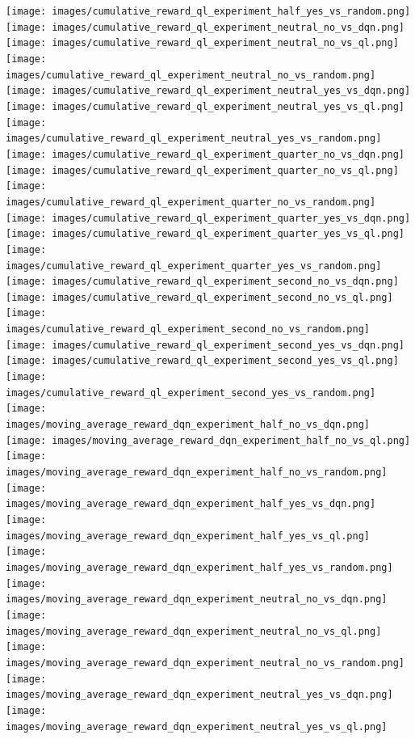 \texttt{[image: images/cumulative\_reward\_ql\_experiment\_half\_yes\_vs\_random.png]} 
\texttt{[image: images/cumulative\_reward\_ql\_experiment\_neutral\_no\_vs\_dqn.png]} 
\texttt{[image: images/cumulative\_reward\_ql\_experiment\_neutral\_no\_vs\_ql.png]} 
\texttt{[image: images/cumulative\_reward\_ql\_experiment\_neutral\_no\_vs\_random.png]} 
\texttt{[image: images/cumulative\_reward\_ql\_experiment\_neutral\_yes\_vs\_dqn.png]} 
\texttt{[image: images/cumulative\_reward\_ql\_experiment\_neutral\_yes\_vs\_ql.png]} 
\texttt{[image: images/cumulative\_reward\_ql\_experiment\_neutral\_yes\_vs\_random.png]} 
\texttt{[image: images/cumulative\_reward\_ql\_experiment\_quarter\_no\_vs\_dqn.png]} 
\texttt{[image: images/cumulative\_reward\_ql\_experiment\_quarter\_no\_vs\_ql.png]} 
\texttt{[image: images/cumulative\_reward\_ql\_experiment\_quarter\_no\_vs\_random.png]} 
\texttt{[image: images/cumulative\_reward\_ql\_experiment\_quarter\_yes\_vs\_dqn.png]} 
\texttt{[image: images/cumulative\_reward\_ql\_experiment\_quarter\_yes\_vs\_ql.png]} 
\texttt{[image: images/cumulative\_reward\_ql\_experiment\_quarter\_yes\_vs\_random.png]} 
\texttt{[image: images/cumulative\_reward\_ql\_experiment\_second\_no\_vs\_dqn.png]} 
\texttt{[image: images/cumulative\_reward\_ql\_experiment\_second\_no\_vs\_ql.png]} 
\texttt{[image: images/cumulative\_reward\_ql\_experiment\_second\_no\_vs\_random.png]} 
\texttt{[image: images/cumulative\_reward\_ql\_experiment\_second\_yes\_vs\_dqn.png]} 
\texttt{[image: images/cumulative\_reward\_ql\_experiment\_second\_yes\_vs\_ql.png]} 
\texttt{[image: images/cumulative\_reward\_ql\_experiment\_second\_yes\_vs\_random.png]} 
\texttt{[image: images/moving\_average\_reward\_dqn\_experiment\_half\_no\_vs\_dqn.png]} 
\texttt{[image: images/moving\_average\_reward\_dqn\_experiment\_half\_no\_vs\_ql.png]} 
\texttt{[image: images/moving\_average\_reward\_dqn\_experiment\_half\_no\_vs\_random.png]} 
\texttt{[image: images/moving\_average\_reward\_dqn\_experiment\_half\_yes\_vs\_dqn.png]} 
\texttt{[image: images/moving\_average\_reward\_dqn\_experiment\_half\_yes\_vs\_ql.png]} 
\texttt{[image: images/moving\_average\_reward\_dqn\_experiment\_half\_yes\_vs\_random.png]} 
\texttt{[image: images/moving\_average\_reward\_dqn\_experiment\_neutral\_no\_vs\_dqn.png]} 
\texttt{[image: images/moving\_average\_reward\_dqn\_experiment\_neutral\_no\_vs\_ql.png]} 
\texttt{[image: images/moving\_average\_reward\_dqn\_experiment\_neutral\_no\_vs\_random.png]} 
\texttt{[image: images/moving\_average\_reward\_dqn\_experiment\_neutral\_yes\_vs\_dqn.png]} 
\texttt{[image: images/moving\_average\_reward\_dqn\_experiment\_neutral\_yes\_vs\_ql.png]} 
